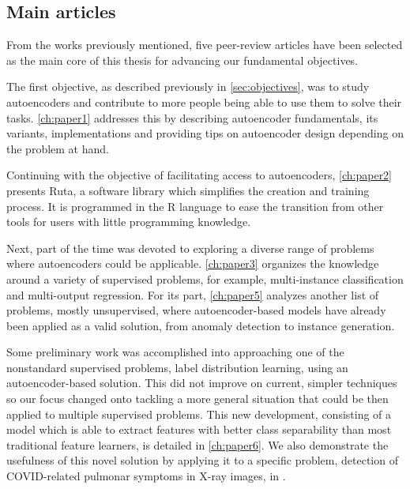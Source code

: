 \clearpage
\subsection{Main articles}

From the works previously mentioned, five peer-review articles have been selected as the main core of this thesis for advancing our fundamental objectives.

The first objective, as described previously in \autoref{sec:objectives}, was to study autoencoders and contribute to more people being able to use them to solve their tasks. \autoref{ch:paper1} addresses this by describing autoencoder fundamentals, its variants, implementations and providing tips on autoencoder design depending on the problem at hand.

Continuing with the objective of facilitating access to autoencoders, \autoref{ch:paper2} presents Ruta, a software library which simplifies the creation and training process. It is programmed in the R language to ease the transition from other tools for users with little programming knowledge.

Next, part of the time was devoted to exploring a diverse range of problems where autoencoders could be applicable. \autoref{ch:paper3} organizes the knowledge around a variety of supervised problems, for example, multi-instance classification and multi-output regression. For its part, \autoref{ch:paper5} analyzes another list of problems, mostly unsupervised, where autoencoder-based models have already been applied as a valid solution, from anomaly detection to instance generation.

Some preliminary work was accomplished into approaching one of the nonstandard supervised problems, label distribution learning, using an autoencoder-based solution. This did not improve on current, simpler techniques so our focus changed onto tackling a more general situation that could be then applied to multiple supervised problems. This new development, consisting of a model which is able to extract features with better class separability than most traditional feature learners, is detailed in \autoref{ch:paper6}. We also demonstrate the usefulness of this novel solution by applying it to a specific problem, detection of COVID-related pulmonar symptoms in X-ray images, in .
